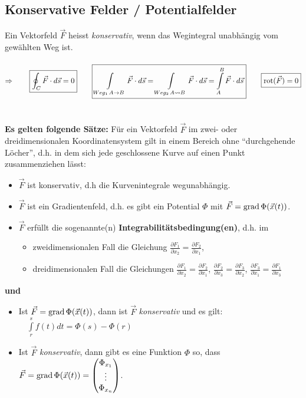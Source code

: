 \subsection{Konservative Felder / Potentialfelder}
Ein Vektorfeld $\vec{F}$ heisst \textit{konservativ}, wenn das Wegintegral
unabhängig vom gewählten Weg ist.\\\\
$\Rightarrow\qquad \boxed{\oint_C \vec{F}\cdot d\vec{s}=0}\qquad\boxed{
\int\limits_{Weg_1\, A\rightarrow B} \vec{F}\cdot d\vec{s}=\int\limits_{Weg_2\,
A\leadsto B} \vec{F}\cdot d\vec{s}=\int\limits_A^B \vec{F}\cdot
d\vec{s}}\qquad\boxed{\operatorname{rot} (\vec{F})=0}$\\\\\\	
\textbf{Es gelten folgende Sätze:}
Für ein Vektorfeld $\vec{F}$ im zwei- oder dreidimensionalen Koordinatensystem
gilt in einem Bereich ohne "`durchgehende Löcher"', d.h. in dem sich jede
geschlossene Kurve auf einen Punkt zusammenziehen lässt:
\begin{itemize}
  \item $\vec{F}$ ist konservativ, d.h die Kurvenintegrale wegunabhängig.
  \item $\vec{F}$ ist ein Gradientenfeld, d.h. es gibt ein Potential $\Phi$ mit
  $\vec{F}=\operatorname{grad} \Phi(\vec{x}(t))$.
  \item $\vec{F}$ erfüllt die sogenannte(n)
  \textbf{Integrabilitätsbedingung(en)}, d.h. im
  \begin{itemize}
    \item zweidimensionalen Fall die Gleichung $\frac{\partial F_1}{\partial
    x_2}=\frac{\partial F_2}{\partial x_1}$,
    \item dreidimensionalen Fall die Gleichungen $\frac{\partial F_1}{\partial
    x_2}=\frac{\partial F_2}{\partial x_1}$, $\frac{\partial F_2}{\partial
    x_3}=\frac{\partial F_3}{\partial x_2}$, $\frac{\partial F_3}{\partial
    x_1}=\frac{\partial F_1}{\partial x_3}$
  \end{itemize}
\end{itemize}
\textbf{und}
\begin{itemize}
  \item Ist $\vec{F}=\operatorname{grad} \Phi(\vec{x}(t))$, dann ist $\vec{F}$  
  \textit{konservativ} und es gilt: $\quad\int\limits_r^s f(t)
  dt=\Phi(s)-\Phi(r)$
  \item Ist $\vec{F}$ \textit{konservativ}, dann gibt es eine Funktion $\Phi$
  so, dass $\vec{F}=\operatorname{grad} \Phi(\vec{x}(t))=
  \begin{pmatrix}
    \Phi_{x_1}\\
    \vdots\\ 
    \Phi_{x_n}
  \end{pmatrix}$.

\end{itemize}
\newpage
